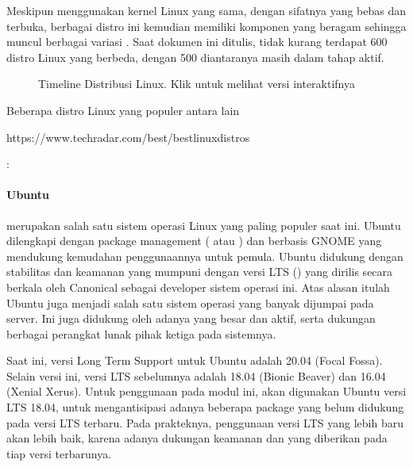 \documentclass[letterpaper,10pt,english]{sphinxmanual}
\begin{document}
Meskipun menggunakan kernel Linux yang sama, dengan sifatnya yang bebas dan terbuka, berbagai distro ini kemudian memiliki komponen yang beragam sehingga muncul berbagai variasi . Saat dokumen ini ditulis, tidak kurang terdapat 600 distro Linux yang berbeda, dengan 500 diantaranya masih dalam tahap  aktif.

\begin{figure}[htbp]
\centering
\capstart

\noindent{}
\caption{Timeline Distribusi Linux. Klik  untuk melihat versi interaktifnya}\label{\detokenize{sesi1/pengantarlinux:distro-linux}}\end{figure}

Beberapa distro Linux yang populer antara lain %
\begin{footnote}[1]\sphinxAtStartFootnote
https://www.techradar.com/best/best\sphinxhyphen{}linux\sphinxhyphen{}distros
%
\end{footnote}:


\paragraph{Ubuntu}
\label{\detokenize{sesi1/pengantarlinux:ubuntu}}
 merupakan salah satu sistem operasi Linux yang paling populer saat ini. Ubuntu dilengkapi dengan package management ( atau ) dan  berbasis GNOME yang mendukung kemudahan penggunaannya untuk pemula. Ubuntu didukung dengan stabilitas dan keamanan yang mumpuni dengan versi LTS () yang dirilis secara berkala oleh Canonical sebagai developer sistem operasi ini. Atas alasan itulah Ubuntu juga menjadi salah satu sistem operasi yang banyak dijumpai pada server. Ini juga didukung oleh adanya  yang besar dan aktif, serta dukungan berbagai perangkat lunak pihak ketiga pada sistemnya.


Saat ini, versi Long Term Support untuk Ubuntu adalah 20.04 (Focal Fossa). Selain versi ini, versi LTS sebelumnya adalah 18.04 (Bionic Beaver) dan 16.04 (Xenial Xerus). Untuk penggunaan pada modul ini, akan digunakan Ubuntu versi LTS 18.04, untuk mengantisipasi adanya beberapa package yang belum didukung pada versi LTS terbaru. Pada prakteknya, penggunaan versi LTS yang lebih baru akan lebih baik, karena adanya dukungan keamanan dan  yang diberikan pada tiap versi terbarunya.
\end{document}
